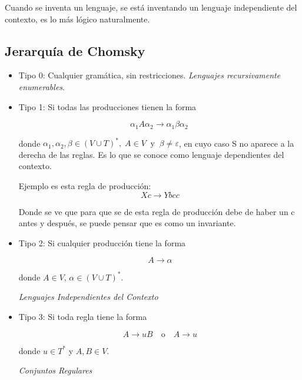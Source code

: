 \documentclass[12pt]{report} %
\begin{document}
Cuando se inventa un lenguaje, se está inventando un lenguaje
independiente del contexto, es lo más lógico naturalmente.

\hypertarget{jerarquuxeda-de-chomsky}{%
\subsection{Jerarquía de Chomsky}\label{jerarquuxeda-de-chomsky}}

\begin{itemize}
\item
  Tipo 0: Cualquier gramática, sin restricciones. \emph{Lenguajes
  recursivamente enumerables}.
\item
  Tipo 1: Si todas las producciones tienen la forma

  \[
    \alpha_1A\alpha_2 \rightarrow \alpha_1\beta\alpha_2\
    \]

  donde
  \(\alpha_1, \alpha_2, \beta \in (V \cup T)^*,\; A \in V \;\; \text{y} \;\; \beta \neq \varepsilon\),
  en cuyo caso S no aparece a la derecha de las reglas. Es lo que se
  conoce como lenguaje dependientes del contexto.

  Ejemplo es esta regla de producción: \[
    Xc \rightarrow Ybcc 
    \]

  Donde se ve que para que se de esta regla de producción debe de haber
  un c antes y después, se puede pensar que es como un invariante.
\item
  Tipo 2: Si cualquier producción tiene la forma

  \[
    A \to \alpha
    \]

  donde \(A \in V\), \(\alpha \in (V \cup T)^*\).

  \emph{Lenguajes Independientes del Contexto}
\item
  Tipo 3: Si toda regla tiene la forma

  \[
    A \to uB \quad \text{o} \quad A \to u
    \]

  donde \(u \in T^*\) y \(A, B \in V\).

  \emph{Conjuntos Regulares}
\end{itemize}

\begin{center}
\end{center}
\end{document}
